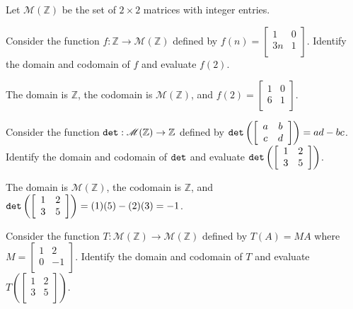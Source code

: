 \begin{exam}
\label{exam_matrix_functions}
    Let $\mathscr{M}(\mathbb{Z})$ be the set of $2 \times 2$ matrices with integer entries.
    \begin{apart}
        \item Consider the function $f: \mathbb{Z} \to \mathscr{M}(\mathbb{Z})$ defined by $f(n) = \left[ \begin{array}{cc} 1 & 0 \\ 3n & 1 \\ \end{array} \right]$. Identify the domain and codomain of $f$ and evaluate $f(2)$.
            \begin{soln}
                The domain is $\mathbb{Z}$, the codomain is $\mathscr{M}(\mathbb{Z})$, and $f(2) = \left[ \begin{array}{cc} 1 & 0 \\ 6 & 1 \\ \end{array} \right]$.
            \end{soln}
        \item Consider the function $\texttt{det}: \mathscr{M}(\mathbb{Z}) \to \mathbb{Z}$ defined by $\texttt{det} \left( \left[ \begin{array}{cc} a & b \\ c & d \\ \end{array} \right] \right) = ad-bc$. Identify the domain and codomain of $\texttt{det}$ and evaluate $\texttt{det}\left( \left[ \begin{array}{cc} 1 & 2 \\ 3 & 5 \\ \end{array} \right] \right)$.
            \begin{soln}
                The domain is $\mathscr{M}(\mathbb{Z})$, the codomain is $\mathbb{Z}$, and $\texttt{det}\left( \left[ \begin{array}{cc} 1 & 2 \\ 3 & 5 \\ \end{array} \right] \right)=(1)(5)-(2)(3) = -1$.                
            \end{soln}
        \item \label{part_mult_matrix_fn} Consider the function $T: \mathscr{M}(\mathbb{Z}) \to \mathscr{M}(\mathbb{Z})$ defined by $T(A) = MA$ where $M = \left[ \begin{array}{cr} 1 & 2 \\ 0 & -1 \\ \end{array} \right] $. Identify the domain and codomain of $T$ and evaluate $T\left( \left[ \begin{array}{cc} 1 & 2 \\ 3 & 5 \\ \end{array} \right] \right)$.

\end{apart}
\end{exam}
